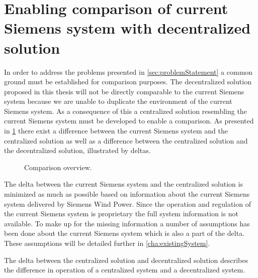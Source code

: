 \section{Enabling comparison of current Siemens system with decentralized solution}
In order to address the problems presented in \cref{sec:problemStatement} a common ground must be established for comparison purposes. The decentralized solution proposed in this thesis will not be directly comparable to the current Siemens system because we are unable to duplicate the environment of the current Siemens system. As a consequence of this a centralized solution resembling the current Siemens system must be developed to enable a comparison. As presented in \cref{fig:projectDiffOverview} there exist a difference between the current Siemens system and the centralized solution as well as a difference between the centralized solution and the decentralized solution, illustrated by deltas.

\begin{figure}[!h]
	\centering
	
	\caption[Comparison overview]{
		\label{fig:projectDiffOverview} 
		\footnotesize{%
			Comparison overview.
		}
	}
\end{figure}

The delta between the current Siemens system and the centralized solution is minimized as much as possible based on information about the current Siemens system delivered by Siemens Wind Power. Since the operation and regulation of the current Siemens system is proprietary the full system information is not available. To make up for the missing information a number of assumptions has been done about the current Siemens system which is also a part of the delta. These assumptions will be detailed further in \cref{cha:existingSystem}. 

The delta between the centralized solution and decentralized solution describes the difference in operation of a centralized system and a decentralized system.



